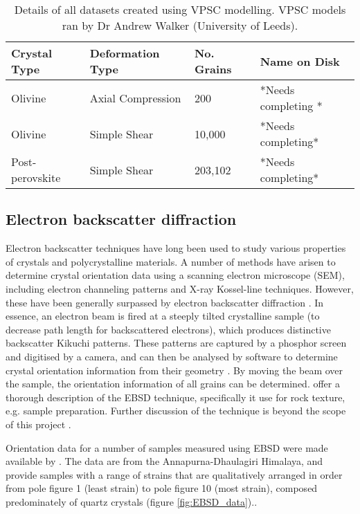 \documentclass[a4paper,12pt]{report}
\numberwithin{equation}{chapter}
\begin{document}
\begin{table} 
	\centering
	\caption[VPSC datasets]{Details of all datasets created using VPSC modelling. VPSC models ran by Dr Andrew Walker (University of Leeds).\\}
\begin{tabularx}{\textwidth}{X X X X}
	\hline
	\hline
	Crystal Type    & Deformation Type  & No. Grains & Name on Disk \\
	\hline
	\hline
	Olivine         & Axial Compression & 200        & *Needs completing *    \\
	Olivine         & Simple Shear      & 10,000     & *Needs completing*    \\
	Post-perovskite & Simple Shear      & 203,102    & *Needs completing*    \\
	\hline
	\end{tabularx}
\label{tab:VPSC_data}
\end{table}

\subsection{Electron backscatter diffraction}
Electron backscatter techniques have long been used to study various properties of crystals and polycrystalline materials. A number of methods have arisen to determine crystal orientation data using a scanning electron microscope (SEM), including electron channeling patterns and X-ray Kossel-line techniques. However, these have been generally surpassed by electron backscatter diffraction \citep[EBSD or backscatter Kikuchi diffraction,][]{Harland1973}.  In essence, an electron beam is fired at a steeply tilted crystalline sample (to decrease path length for backscattered electrons), which produces distinctive backscatter Kikuchi patterns. These patterns are captured by a phosphor screen and digitised by a camera, and can then be analysed by software to determine crystal orientation information from their geometry  \citep{Zaefferer2007}. By moving the beam over the sample, the orientation information of all grains can be determined. \cite{Prior1999} offer a thorough description of the EBSD technique, specifically it use for rock texture, e.g. sample preparation. Further discussion of the technique is beyond the scope of this project \citep[see][for more info]{Schwarzer1997,Randle2000}.    

Orientation data for a number of samples measured using EBSD were made available by \cite{ParsonsThesis}. The data are from the Annapurna-Dhaulagiri Himalaya, and provide samples with a range of strains that are qualitatively arranged in order from pole figure 1 (least strain) to pole figure 10 (most strain), composed predominately of quartz crystals (figure \ref{fig:EBSD_data}).. 
\end{document}
